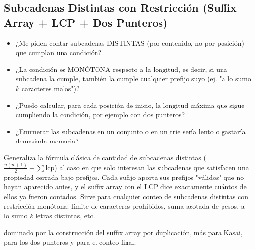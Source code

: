 \subsection{Subcadenas Distintas con Restricción (Suffix Array + LCP + Dos Punteros)}
\label{alg:9-7}


\begin{itemize}
\item ¿Me piden contar subcadenas DISTINTAS (por contenido, no por posición) que cumplan una condición?
\item ¿La condición es MONÓTONA respecto a la longitud, es decir, si una subcadena la cumple, también la cumple cualquier prefijo suyo (ej. "a lo sumo $k$ caracteres malos")?
\item ¿Puedo calcular, para cada posición de inicio, la longitud máxima que sigue cumpliendo la condición, por ejemplo con dos punteros?
\item ¿Enumerar las  subcadenas en un conjunto o en un trie sería lento o gastaría demasiada memoria?
\end{itemize}

 Generaliza la fórmula clásica de cantidad de subcadenas distintas ($\frac{n(n+1)}{2} - \sum \text{lcp}$) al caso en que solo interesan las subcadenas que satisfacen una propiedad cerrada bajo prefijos. Cada sufijo aporta sus prefijos "válidos" que no hayan aparecido antes, y el suffix array con el LCP dice exactamente cuántos de ellos ya fueron contados. Sirve para cualquier conteo de subcadenas distintas con restricción monótona: límite de caracteres prohibidos, suma acotada de pesos, a lo sumo $k$ letras distintas, etc.

  dominado por la construcción del suffix array por duplicación, más  para Kasai,  para los dos punteros y  para el conteo final.

